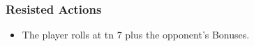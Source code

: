 \subsubsection*{Resisted Actions}

\begin{itemize}
  \item
  The player rolls at \gls{tn} 7 plus the opponent's Bonuses.
\end{itemize}
